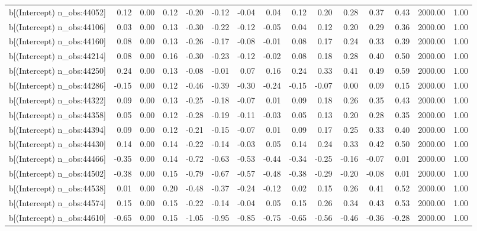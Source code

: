 \begin{table}[ht]
\begin{tabular}{rrrrrrrrrrrrrrr}
  b[(Intercept) n\_obs:44052] & 0.12 & 0.00 & 0.12 & -0.20 & -0.12 & -0.04 & 0.04 & 0.12 & 0.20 & 0.28 & 0.37 & 0.43 & 2000.00 & 1.00 \\ 
  b[(Intercept) n\_obs:44106] & 0.03 & 0.00 & 0.13 & -0.30 & -0.22 & -0.12 & -0.05 & 0.04 & 0.12 & 0.20 & 0.29 & 0.36 & 2000.00 & 1.00 \\ 
  b[(Intercept) n\_obs:44160] & 0.08 & 0.00 & 0.13 & -0.26 & -0.17 & -0.08 & -0.01 & 0.08 & 0.17 & 0.24 & 0.33 & 0.39 & 2000.00 & 1.00 \\ 
  b[(Intercept) n\_obs:44214] & 0.08 & 0.00 & 0.16 & -0.30 & -0.23 & -0.12 & -0.02 & 0.08 & 0.18 & 0.28 & 0.40 & 0.50 & 2000.00 & 1.00 \\ 
  b[(Intercept) n\_obs:44250] & 0.24 & 0.00 & 0.13 & -0.08 & -0.01 & 0.07 & 0.16 & 0.24 & 0.33 & 0.41 & 0.49 & 0.59 & 2000.00 & 1.00 \\ 
  b[(Intercept) n\_obs:44286] & -0.15 & 0.00 & 0.12 & -0.46 & -0.39 & -0.30 & -0.24 & -0.15 & -0.07 & 0.00 & 0.09 & 0.15 & 2000.00 & 1.00 \\ 
  b[(Intercept) n\_obs:44322] & 0.09 & 0.00 & 0.13 & -0.25 & -0.18 & -0.07 & 0.01 & 0.09 & 0.18 & 0.26 & 0.35 & 0.43 & 2000.00 & 1.00 \\ 
  b[(Intercept) n\_obs:44358] & 0.05 & 0.00 & 0.12 & -0.28 & -0.19 & -0.11 & -0.03 & 0.05 & 0.13 & 0.20 & 0.28 & 0.35 & 2000.00 & 1.00 \\ 
  b[(Intercept) n\_obs:44394] & 0.09 & 0.00 & 0.12 & -0.21 & -0.15 & -0.07 & 0.01 & 0.09 & 0.17 & 0.25 & 0.33 & 0.40 & 2000.00 & 1.00 \\ 
  b[(Intercept) n\_obs:44430] & 0.14 & 0.00 & 0.14 & -0.22 & -0.14 & -0.03 & 0.05 & 0.14 & 0.24 & 0.33 & 0.42 & 0.50 & 2000.00 & 1.00 \\ 
  b[(Intercept) n\_obs:44466] & -0.35 & 0.00 & 0.14 & -0.72 & -0.63 & -0.53 & -0.44 & -0.34 & -0.25 & -0.16 & -0.07 & 0.01 & 2000.00 & 1.00 \\ 
  b[(Intercept) n\_obs:44502] & -0.38 & 0.00 & 0.15 & -0.79 & -0.67 & -0.57 & -0.48 & -0.38 & -0.29 & -0.20 & -0.08 & 0.01 & 2000.00 & 1.00 \\ 
  b[(Intercept) n\_obs:44538] & 0.01 & 0.00 & 0.20 & -0.48 & -0.37 & -0.24 & -0.12 & 0.02 & 0.15 & 0.26 & 0.41 & 0.52 & 2000.00 & 1.00 \\ 
  b[(Intercept) n\_obs:44574] & 0.15 & 0.00 & 0.15 & -0.22 & -0.14 & -0.04 & 0.05 & 0.15 & 0.26 & 0.34 & 0.43 & 0.53 & 2000.00 & 1.00 \\ 
  b[(Intercept) n\_obs:44610] & -0.65 & 0.00 & 0.15 & -1.05 & -0.95 & -0.85 & -0.75 & -0.65 & -0.56 & -0.46 & -0.36 & -0.28 & 2000.00 & 1.00 \\ 

\end{tabular}
\end{table}
